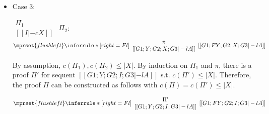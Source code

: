 \begin{itemize}
\item Case 3:
      \begin{center}
        \scriptsize
        \begin{math}
          \begin{array}{c}
            \Pi_1 \\
            {[[I |-c X]]}
          \end{array}
        \end{math}
        \qquad\qquad
        $\Pi_2$:
        \begin{math}
          $$\mprset{flushleft}
          \inferrule* [right={\tiny Fl}] {
            {
              \begin{array}{c}
                \pi \\
                {[[G1; Y; G2; X; G3 |-l A]]}
              \end{array}
            }
          }{[[G1; F Y; G2; X; G3 |-l A]]}
        \end{math}
      \end{center}
      By assumption, $c(\Pi_1),c(\Pi_2)\leq |X|$. By induction on $\Pi_1$
      and $\pi$, there is a proof $\Pi'$ for sequent
      $[[G1; Y; G2; I; G3 |-l A]]$ s.t. $c(\Pi') \leq |X|$. Therefore, the
      proof $\Pi$ can be constructed as follows with
      $c(\Pi) = c(\Pi') \leq |X|$.
      \begin{center}
        \scriptsize
        \begin{math}
          $$\mprset{flushleft}
          \inferrule* [right={\tiny Fl}] {
            {
              \begin{array}{c}
                \Pi' \\
                {[[G1; Y; G2; I; G3 |-l A]]}
              \end{array}
            }
          }{[[G1; F Y; G2; I; G3 |-l A]]}
        \end{math}
      \end{center}


\end{itemize}

